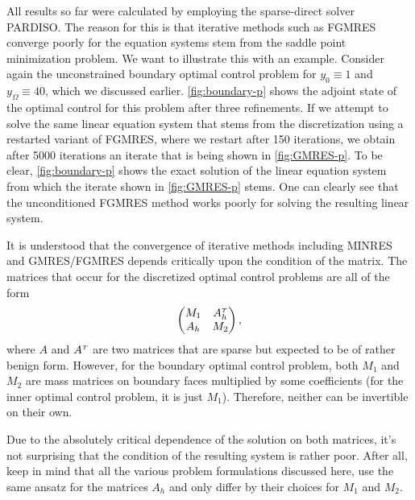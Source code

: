 \documentclass[../thesis.tex]{subfiles}
\begin{document}
All results so far were calculated by employing the sparse-direct solver PARDISO.
The reason for this is that iterative methods such as FGMRES converge poorly for the equation systems stem from the saddle point minimization problem.
We want to illustrate this with an example.
Consider again the unconstrained boundary optimal control problem for $y_0 \equiv 1$ and $y_\Omega \equiv 40$, which we discussed earlier.
\cref{fig:boundary-p} shows the adjoint state of the optimal control for this problem after three refinements.
If we attempt to solve the same linear equation system that stems from the discretization using a restarted variant of FGMRES, where we restart after 150 iterations, we obtain after 5000 iterations an iterate that is being shown in \cref{fig:GMRES-p}.
To be clear, \cref{fig:boundary-p} shows the exact solution of the linear equation system from which the iterate shown in \cref{fig:GMRES-p} stems.
One can clearly see that the unconditioned FGMRES method works poorly for solving the resulting linear system.

It is understood that the convergence of iterative methods including MINRES and GMRES\slash{}FGMRES depends critically upon the condition of the matrix.
The matrices that occur for the discretized optimal control problems are all of the form
\[
	\begin{pmatrix}
		M_1 & A_h^\tp \\
		A_h & M_2
	\end{pmatrix},
\]
where $A$ and $A^\tp$ are two matrices that are sparse but expected to be of rather benign form.
However, for the boundary optimal control problem, both $M_1$ and $M_2$ are mass matrices on boundary faces multiplied by some coefficients (for the inner optimal control problem, it is just $M_1$).
Therefore, neither can be invertible on their own.

Due to the absolutely critical dependence of the solution on both matrices, it's not surprising that the condition of the resulting system is rather poor.
After all, keep in mind that all the various problem formulations discussed here, use the same ansatz for the matrices $A_h$ and only differ by their choices for $M_1$ and $M_2$.
\end{document}
